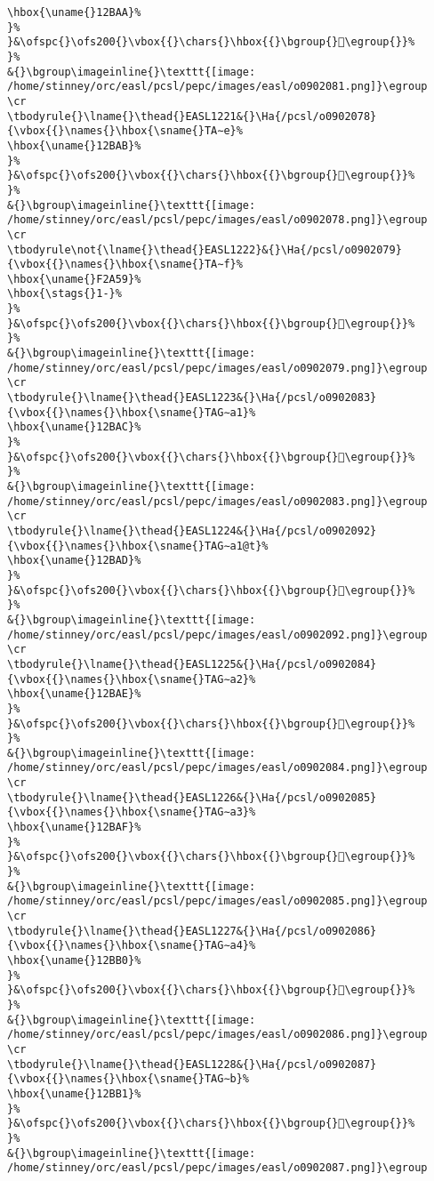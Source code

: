 \begin{verbatim}
\hbox{\uname{}12BAA}%
}%
}&\ofspc{}\ofs200{}\vbox{{}\chars{}\hbox{{}\bgroup{}𒮪\egroup{}}%
}%
&{}\bgroup\imageinline{}\texttt{[image: /home/stinney/orc/easl/pcsl/pepc/images/easl/o0902081.png]}\egroup
\cr
\tbodyrule{}\lname{}\thead{}EASL1221&{}\Ha{/pcsl/o0902078}{\vbox{{}\names{}\hbox{\sname{}TA∼e}%
\hbox{\uname{}12BAB}%
}%
}&\ofspc{}\ofs200{}\vbox{{}\chars{}\hbox{{}\bgroup{}𒮫\egroup{}}%
}%
&{}\bgroup\imageinline{}\texttt{[image: /home/stinney/orc/easl/pcsl/pepc/images/easl/o0902078.png]}\egroup
\cr
\tbodyrule\not{\lname{}\thead{}EASL1222}&{}\Ha{/pcsl/o0902079}{\vbox{{}\names{}\hbox{\sname{}TA∼f}%
\hbox{\uname{}F2A59}%
\hbox{\stags{}1-}%
}%
}&\ofspc{}\ofs200{}\vbox{{}\chars{}\hbox{{}\bgroup{}󲩙\egroup{}}%
}%
&{}\bgroup\imageinline{}\texttt{[image: /home/stinney/orc/easl/pcsl/pepc/images/easl/o0902079.png]}\egroup
\cr
\tbodyrule{}\lname{}\thead{}EASL1223&{}\Ha{/pcsl/o0902083}{\vbox{{}\names{}\hbox{\sname{}TAG∼a1}%
\hbox{\uname{}12BAC}%
}%
}&\ofspc{}\ofs200{}\vbox{{}\chars{}\hbox{{}\bgroup{}𒮬\egroup{}}%
}%
&{}\bgroup\imageinline{}\texttt{[image: /home/stinney/orc/easl/pcsl/pepc/images/easl/o0902083.png]}\egroup
\cr
\tbodyrule{}\lname{}\thead{}EASL1224&{}\Ha{/pcsl/o0902092}{\vbox{{}\names{}\hbox{\sname{}TAG∼a1@t}%
\hbox{\uname{}12BAD}%
}%
}&\ofspc{}\ofs200{}\vbox{{}\chars{}\hbox{{}\bgroup{}𒮭\egroup{}}%
}%
&{}\bgroup\imageinline{}\texttt{[image: /home/stinney/orc/easl/pcsl/pepc/images/easl/o0902092.png]}\egroup
\cr
\tbodyrule{}\lname{}\thead{}EASL1225&{}\Ha{/pcsl/o0902084}{\vbox{{}\names{}\hbox{\sname{}TAG∼a2}%
\hbox{\uname{}12BAE}%
}%
}&\ofspc{}\ofs200{}\vbox{{}\chars{}\hbox{{}\bgroup{}𒮮\egroup{}}%
}%
&{}\bgroup\imageinline{}\texttt{[image: /home/stinney/orc/easl/pcsl/pepc/images/easl/o0902084.png]}\egroup
\cr
\tbodyrule{}\lname{}\thead{}EASL1226&{}\Ha{/pcsl/o0902085}{\vbox{{}\names{}\hbox{\sname{}TAG∼a3}%
\hbox{\uname{}12BAF}%
}%
}&\ofspc{}\ofs200{}\vbox{{}\chars{}\hbox{{}\bgroup{}𒮯\egroup{}}%
}%
&{}\bgroup\imageinline{}\texttt{[image: /home/stinney/orc/easl/pcsl/pepc/images/easl/o0902085.png]}\egroup
\cr
\tbodyrule{}\lname{}\thead{}EASL1227&{}\Ha{/pcsl/o0902086}{\vbox{{}\names{}\hbox{\sname{}TAG∼a4}%
\hbox{\uname{}12BB0}%
}%
}&\ofspc{}\ofs200{}\vbox{{}\chars{}\hbox{{}\bgroup{}𒮰\egroup{}}%
}%
&{}\bgroup\imageinline{}\texttt{[image: /home/stinney/orc/easl/pcsl/pepc/images/easl/o0902086.png]}\egroup
\cr
\tbodyrule{}\lname{}\thead{}EASL1228&{}\Ha{/pcsl/o0902087}{\vbox{{}\names{}\hbox{\sname{}TAG∼b}%
\hbox{\uname{}12BB1}%
}%
}&\ofspc{}\ofs200{}\vbox{{}\chars{}\hbox{{}\bgroup{}𒮱\egroup{}}%
}%
&{}\bgroup\imageinline{}\texttt{[image: /home/stinney/orc/easl/pcsl/pepc/images/easl/o0902087.png]}\egroup

\end{verbatim}
